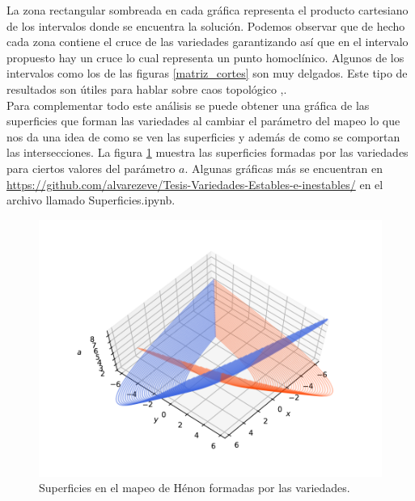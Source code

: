 

La zona rectangular sombreada en cada gráfica representa el producto cartesiano de los intervalos donde se encuentra la solución. Podemos observar que de hecho cada zona contiene el cruce de las variedades garantizando así que en el intervalo propuesto hay un cruce lo cual representa un punto homoclínico. Algunos de los intervalos como los de las figuras \ref{matriz_cortes} son muy delgados. Este tipo de resultados son útiles para hablar sobre caos topológico \cite{devaney},\cite{gerald}.\\

Para complementar todo este análisis se puede obtener una gráfica de las superficies que forman las variedades al cambiar el parámetro del mapeo lo que nos da una idea de como se ven las superficies y además de como se comportan las intersecciones. La figura \ref{SuperficiesH} muestra las superficies formadas por las variedades para ciertos valores del parámetro $a$. Algunas gráficas más se encuentran en \url{https://github.com/alvarezeve/Tesis-Variedades-Estables-e-inestables/} en el archivo llamado Superficies.ipynb.
\begin{figure}[H]
\centering
\includegraphics[scale=0.9]{HenonV}
\caption{Superficies en el mapeo de Hénon formadas por las variedades.}
\label{SuperficiesH}
\end{figure}



